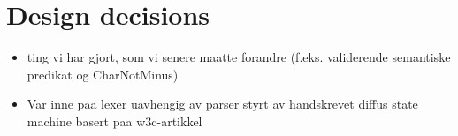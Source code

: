 \section{Design decisions}
\begin{itemize}
\item ting vi har gjort, som vi senere maatte forandre (f.eks. validerende semantiske predikat og CharNotMinus)
\item Var inne paa lexer uavhengig av parser styrt av handskrevet diffus state machine basert paa w3c-artikkel
\end{itemize}